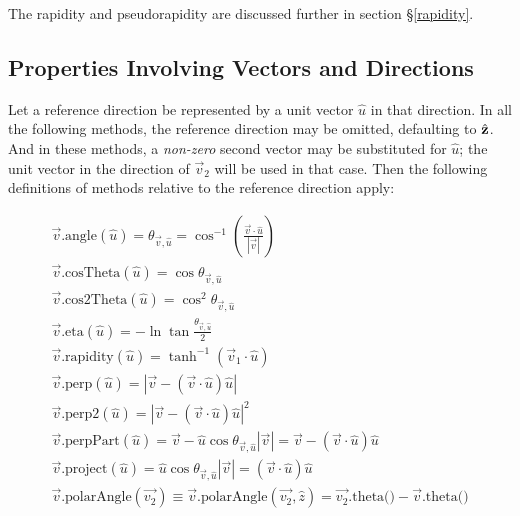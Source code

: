 \documentclass[twoside,12pt]{article}
\begin{document}
The rapidity and pseudorapidity are discussed further in
section \S{\ref{rapidity}}.

\subsection{Properties Involving Vectors and Directions}

Let a reference direction be represented by a unit vector $\hat{u}$ in that
direction.
In all the following methods, the reference direction may be
omitted, defaulting to $\hat{\bf z}$.
And in these methods, a {\em non-zero} second vector may be
substituted for $\hat{u}$; the unit vector in the direction of $\vec{v}_2$
will be used in that case.
Then the following definitions of methods relative to the reference direction
apply:

\begin{eqnarray}
  \vec{v}\mbox{.angle} (\hat{u}) =
    \theta_{\vec{v},\hat{u}} =
    \cos^{-1} \left( \frac{ \vec{v} \cdot \hat{u} }
    { \left| \vec{v} \right| } \right)
    \label{eq:angle} \label{eq:theta} \\
  \vec{v}\mbox{.cosTheta} (\hat{u}) =
    \cos \theta_{\vec{v},\hat{u}}
    \label{eq:cosTheta} \\
  \vec{v}\mbox{.cos2Theta} (\hat{u}) =
    \cos^2 \theta_{\vec{v},\hat{u}}
    \label{eq:cos2Theta} \\
  \vec{v}\mbox{.eta} (\hat{u}) =
    -\ln \tan \frac {\theta_{\vec{v},\hat{u}}}{2}
    \label{eq:eta:2} \\
  \vec{v}\mbox{.rapidity} (\hat{u}) =
    \tanh^{-1} (\vec{v}_{1} \cdot \hat{u})
    \label{eq:rap:2} \\
  \vec{v}\mbox{.perp} (\hat{u}) =
    \left| \vec{v} - (\vec{v} \cdot \hat{u}) \hat{u} \right|
    \label{eq:perp} \\
  \vec{v}\mbox{.perp2} (\hat{u}) =
    \left| \vec{v} - (\vec{v} \cdot \hat{u}) \hat{u} \right| ^2
    \label{eq:perp2} \\
  \vec{v}\mbox{.perpPart} (\hat{u}) =
    \vec{v} -
    \hat{u} \cos \theta_{\vec{v},\hat{u}}
    \left| \vec{v} \right| =
    \vec{v} - (\vec{v} \cdot \hat{u}) \hat{u}
    \label{eq:perpPart} \\
  \vec{v}\mbox{.project} (\hat{u}) =
    \hat{u} \cos \theta_{\vec{v},\hat{u}}
    \left| \vec{v} \right| =
    (\vec{v} \cdot \hat{u}) \hat{u}
    \label{eq:project} \\
  \vec{v}\mbox{.polarAngle} (\vec{v_2})
    \equiv \vec{v}\mbox{.polarAngle} (\vec{v_2}, \hat{z}) =
    \vec{v_2}\mbox{.theta()} - \vec{v}\mbox{.theta()}

\end{eqnarray}
\end{document}

